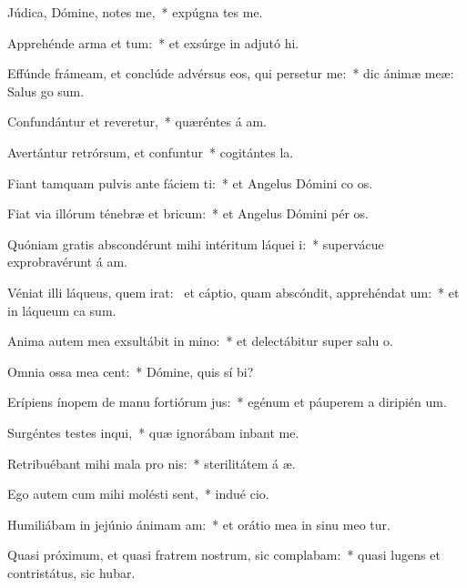 \item Júdica, Dómine, notes me,~* expúgna tes me.
\item Apprehénde arma et tum:~* et exsúrge in adjutó hi.
\item Effúnde frámeam, et conclúde advérsus eos, qui persetur me:~* dic ánimæ meæ: Salus  go sum.
\item Confundántur et reveretur,~* quæréntes á am.
\item Avertántur retrórsum, et confuntur~* cogitántes  la.
\item Fiant tamquam pulvis ante fáciem ti:~* et Angelus Dómini co os.
\item Fiat via illórum ténebræ et bricum:~* et Angelus Dómini pér os.
\item Quóniam gratis abscondérunt mihi intéritum láquei i:~* supervácue exprobravérunt á am.
\item Véniat illi láqueus, quem irat:~\pscross{} et cáptio, quam abscóndit, apprehéndat um:~* et in láqueum ca  sum.
\item Anima autem mea exsultábit in mino:~* et delectábitur super salu o.
\item Omnia ossa mea cent:~* Dómine, quis sí bi?
\item Erípiens ínopem de manu fortiórum jus:~* egénum et páuperem a diripién um.
\item Surgéntes testes inqui,~* quæ ignorábam inbant me.
\item Retribuébant mihi mala pro nis:~* sterilitátem á æ.
\item Ego autem cum mihi molésti sent,~* indué cio.
\item Humiliábam in jejúnio ánimam am:~* et orátio mea in sinu meo tur.
\item Quasi próximum, et quasi fratrem nostrum, sic complabam:~* quasi lugens et contristátus, sic hubar.
